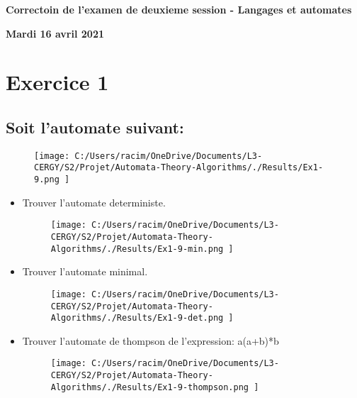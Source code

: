 \documentclass{article}%
\begin{document}
%
\normalsize%
\pagestyle{header}%
\begin{minipage}{\textwidth}%
\centering%
\begin{Large}%
\textbf{Correctoin de l'examen de deuxieme session {-} Langages et automates}%
\end{Large}%
\linebreak%
\begin{large}%
\textbf{Mardi 16 avril 2021}%
\end{large}%
\end{minipage}%
\section{Exercice 1}%
\label{sec:Exercice1}%
\subsection{Soit l'automate suivant:}%
\label{subsec:Soitlautomatesuivant}%


\begin{figure}[h]%
\centering%
\texttt{[image: C:/Users/racim/OneDrive/Documents/L3-CERGY/S2/Projet/Automata-Theory-Algorithms/./Results/Ex1-9.png ]}%
\end{figure}

%
\begin{itemize}%
\item%
Trouver l'automate deterministe.%


\begin{figure}[h]%
\centering%
\texttt{[image: C:/Users/racim/OneDrive/Documents/L3-CERGY/S2/Projet/Automata-Theory-Algorithms/./Results/Ex1-9-min.png ]}%
\end{figure}

%
\item%
Trouver l'automate minimal.%


\begin{figure}[h]%
\centering%
\texttt{[image: C:/Users/racim/OneDrive/Documents/L3-CERGY/S2/Projet/Automata-Theory-Algorithms/./Results/Ex1-9-det.png ]}%
\end{figure}

%
\item%
Trouver l'automate de thompson de l'expression: a(a+b)*b%


\begin{figure}[h]%
\centering%
\texttt{[image: C:/Users/racim/OneDrive/Documents/L3-CERGY/S2/Projet/Automata-Theory-Algorithms/./Results/Ex1-9-thompson.png ]}%
\end{figure}

%
\end{itemize}

%
\end{document}
